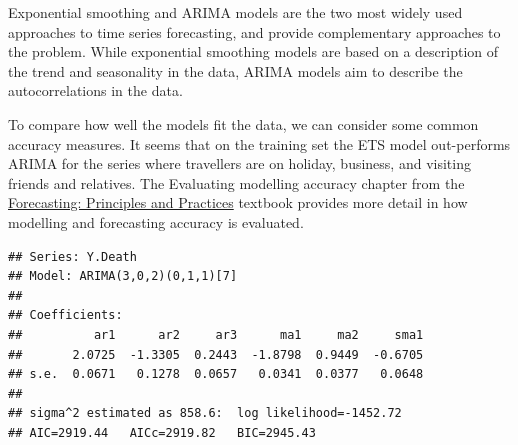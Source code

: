 \documentclass[]{book}
\newenvironment{Shaded}{\begin{snugshade}}{\end{snugshade}}
\newcommand{\KeywordTok}[1]{\textcolor[rgb]{0.13,0.29,0.53}{\textbf{#1}}}
\newcommand{\DataTypeTok}[1]{\textcolor[rgb]{0.13,0.29,0.53}{#1}}
\newcommand{\StringTok}[1]{\textcolor[rgb]{0.31,0.60,0.02}{#1}}
\newcommand{\CommentTok}[1]{\textcolor[rgb]{0.56,0.35,0.01}{\textit{#1}}}
\newcommand{\OtherTok}[1]{\textcolor[rgb]{0.56,0.35,0.01}{#1}}
\newcommand{\OperatorTok}[1]{\textcolor[rgb]{0.81,0.36,0.00}{\textbf{#1}}}
\newcommand{\NormalTok}[1]{#1}
\begin{document}
Exponential smoothing and ARIMA models are the two most widely used
approaches to time series forecasting, and provide complementary
approaches to the problem. While exponential smoothing models are based
on a description of the trend and seasonality in the data, ARIMA models
aim to describe the autocorrelations in the data.

To compare how well the models fit the data, we can consider some common
accuracy measures. It seems that on the training set the ETS model
out-performs ARIMA for the series where travellers are on holiday,
business, and visiting friends and relatives. The Evaluating modelling
accuracy chapter from the \href{https://otexts.com/fpp3/}{Forecasting:
Principles and Practices} textbook provides more detail in how modelling
and forecasting accuracy is evaluated.

\begin{Shaded}
\end{Shaded}

\begin{verbatim}
## Series: Y.Death 
## Model: ARIMA(3,0,2)(0,1,1)[7] 
## 
## Coefficients:
##          ar1      ar2     ar3      ma1     ma2     sma1
##       2.0725  -1.3305  0.2443  -1.8798  0.9449  -0.6705
## s.e.  0.0671   0.1278  0.0657   0.0341  0.0377   0.0648
## 
## sigma^2 estimated as 858.6:  log likelihood=-1452.72
## AIC=2919.44   AICc=2919.82   BIC=2945.43
\end{verbatim}
\end{document}
